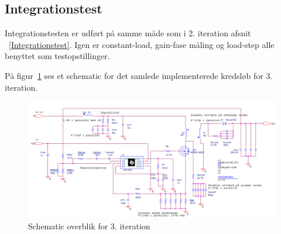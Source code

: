 \clearpage

\subsection{Integrationstest}
Integrationstesten er udført på samme måde som i 2. iteration afsnit ~\ref{Integrationstest}. Igen er constant-load, gain-fase måling og load-step alle benyttet som testopstillinger. 

På figur~\ref{fig:sche3iteration} ses et schematic for det samlede implementerede kredsløb for 3. iteration.
\begin{figure}[H]
	\center
	\includegraphics[max width=1.2\linewidth]{../dokumentation/tex/3iteration/billeder/realisering/samlet_opstilling.PNG}
	\caption{Schematic overblik for 3. iteration}
	\label{fig:sche3iteration}
\end{figure}
